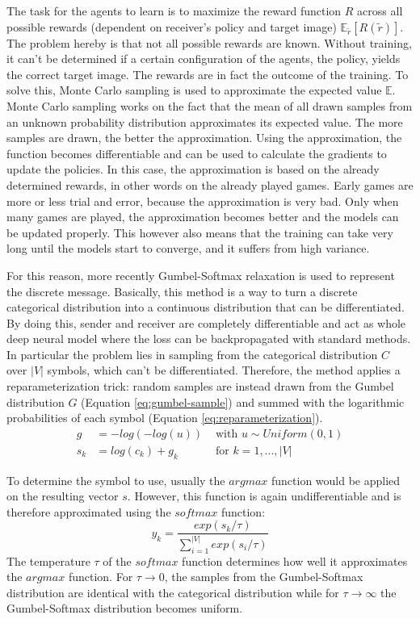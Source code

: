 The task for the agents to learn is to maximize the reward function $R$ across all possible rewards (dependent on receiver's policy and target image) $\mathbb{E}_{\tilde{r}}[R(\tilde{r})]$.
The problem hereby is that not all possible rewards are known.
Without training, it can't be determined if a certain configuration of the agents, the policy, yields the correct target image.
The rewards are in fact the outcome of the training.
To solve this, Monte Carlo sampling is used to approximate the expected value $\mathbb{E}$.
Monte Carlo sampling works on the fact that the mean of all drawn samples from an unknown probability distribution approximates its expected value.
The more samples are drawn, the better the approximation.
Using the approximation, the function becomes differentiable and can be used to calculate the gradients to update the policies.
In this case, the approximation is based on the already determined rewards, in other words on the already played games.
Early games are more or less trial and error, because the approximation is very bad.
Only when many games are played, the approximation becomes better and the models can be updated properly.
This however also means that the training can take very long until the models start to converge, and it suffers from high variance.

For this reason, more recently Gumbel-Softmax relaxation is used to represent the discrete message.
Basically, this method is a way to turn a discrete categorical distribution into a continuous distribution that can be differentiated.
By doing this, sender and receiver are completely differentiable and act as whole deep neural model where the loss can be backpropagated with standard methods.
In particular the problem lies in sampling from the categorical distribution $C$  over $|V|$ symbols, which can't be differentiated.
Therefore, the method applies a reparameterization trick: random samples are instead drawn from the Gumbel distribution $G$ (Equation \ref{eq:gumbel-sample}) and summed with the logarithmic probabilities of each symbol (Equation \ref{eq:reparameterization}).
\begin{align}
    g   & = -log(-log(u))  & \text{ with }u\sim Uniform(0,1) \label{eq:gumbel-sample} \\
    s_k & = log(c_k) + g_k & \text{ for }k = 1,...,|V| \label{eq:reparameterization}
\end{align}

To determine the symbol to use, usually the $argmax$ function would be applied on the resulting vector $s$.
However, this function is again undifferentiable and is therefore approximated using the $softmax$ function:
\begin{equation}
    y_k = \frac{exp(s_k / \tau)}{\sum_{i=1}^{|V|}{exp(s_i / \tau)}}
\end{equation}
The temperature $\tau$ of the $softmax$ function determines how well it approximates the $argmax$ function.
For $\tau \to 0$, the samples from the Gumbel-Softmax distribution are identical with the categorical distribution while for $\tau \to \infty$ the Gumbel-Softmax distribution becomes uniform.


